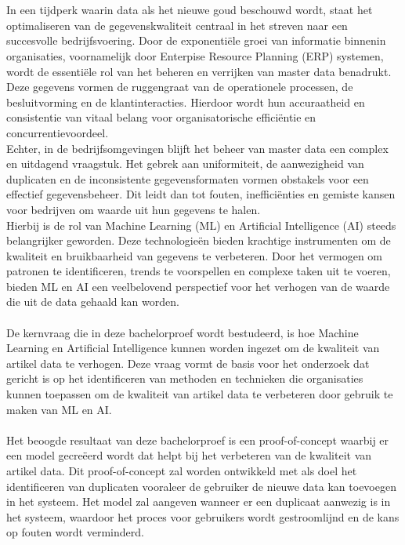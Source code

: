 
\chapter{}%
\label{ch:inleiding}

In een tijdperk waarin data als het nieuwe goud beschouwd wordt, staat het optimaliseren van de gegevenskwaliteit centraal in het streven naar een succesvolle bedrijfsvoering. Door de exponentiële groei van informatie binnenin organisaties, voornamelijk door Enterpise Resource Planning (ERP) systemen, wordt de essentiële rol van het beheren en verrijken van master data benadrukt. Deze gegevens vormen de ruggengraat van de operationele processen, de besluitvorming en de klantinteracties. Hierdoor wordt hun accuraatheid en consistentie van vitaal belang voor organisatorische efficiëntie en concurrentievoordeel.
\\
Echter, in de bedrijfsomgevingen blijft het beheer van master data een complex en uitdagend vraagstuk. Het gebrek aan uniformiteit, de aanwezigheid van duplicaten en de inconsistente gegevensformaten vormen obstakels voor een effectief gegevensbeheer. Dit leidt dan tot fouten, inefficiënties en gemiste kansen voor bedrijven om waarde uit hun gegevens te halen. 
\\
Hierbij is de rol van Machine Learning (ML) en Artificial Intelligence (AI) steeds belangrijker geworden. Deze technologieën bieden krachtige instrumenten om de kwaliteit en bruikbaarheid van gegevens te verbeteren. Door het vermogen om patronen te identificeren, trends te voorspellen en complexe taken uit te voeren, bieden ML en AI een veelbelovend perspectief voor het verhogen van de waarde die uit de data gehaald kan worden.
\\ \\
De kernvraag die in deze bachelorproef wordt bestudeerd, is hoe Machine Learning en Artificial Intelligence kunnen worden ingezet om de kwaliteit van artikel data te verhogen. Deze vraag vormt de basis voor het onderzoek dat gericht is op het identificeren van methoden en technieken die organisaties kunnen toepassen om de kwaliteit van artikel data te verbeteren door gebruik te maken van ML en AI.
\\ \\
Het beoogde resultaat van deze bachelorproef is een proof-of-concept waarbij er een model gecreëerd wordt dat helpt bij het verbeteren van de kwaliteit van artikel data. Dit proof-of-concept zal worden ontwikkeld met als doel het identificeren van duplicaten vooraleer de gebruiker de nieuwe data kan toevoegen in het systeem. Het model zal aangeven wanneer er een duplicaat aanwezig is in het systeem, waardoor het proces voor gebruikers wordt gestroomlijnd en de kans op fouten wordt verminderd.
